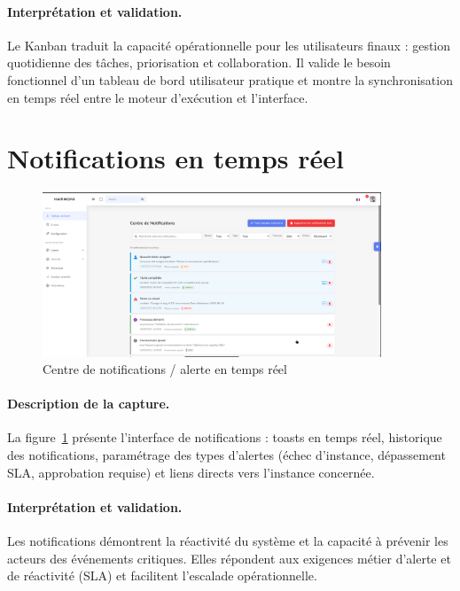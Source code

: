 \paragraph{Interprétation et validation.}  
Le Kanban traduit la capacité opérationnelle pour les utilisateurs finaux : gestion quotidienne des tâches, priorisation et collaboration. Il valide le besoin fonctionnel d’un tableau de bord utilisateur pratique et montre la synchronisation en temps réel entre le moteur d’exécution et l’interface.

\section{Notifications en temps réel}

\begin{figure}[H]
    \centering
    \includegraphics[width=0.9\textwidth]{Images/notification.png}
    \caption{Centre de notifications / alerte en temps réel}
    \label{fig:notification}
\end{figure}

\paragraph{Description de la capture.}  
La figure~\ref{fig:notification} présente l’interface de notifications : toasts en temps réel, historique des notifications, paramétrage des types d’alertes (échec d’instance, dépassement SLA, approbation requise) et liens directs vers l’instance concernée.

\paragraph{Interprétation et validation.}  
Les notifications démontrent la réactivité du système et la capacité à prévenir les acteurs des événements critiques. Elles répondent aux exigences métier d’alerte et de réactivité (SLA) et facilitent l’escalade opérationnelle.

